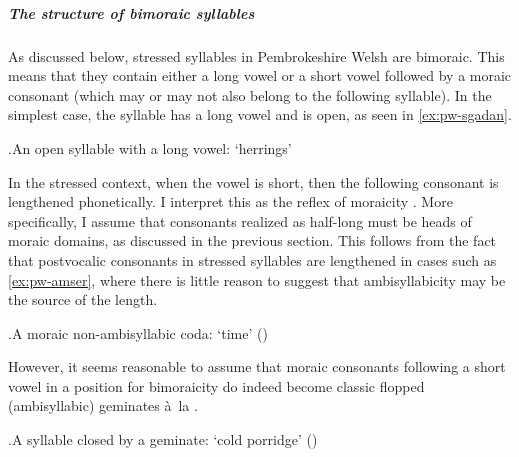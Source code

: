 \subparagraph{The structure of bimoraic syllables}
\label{sec:struct-bimor-syll}

As discussed below, stressed syllables in Pembrokeshire Welsh are bimoraic. This means that they contain either a long vowel or a short vowel followed by a moraic consonant (which may or may not also belong to the following syllable). In the simplest case, the syllable has a long vowel and is open, as seen in \ref{ex:pw-sgadan}.

\ex.\label{ex:pw-sgadan}An open syllable with a long vowel: \ipa{[ˈskaːdan]} `herrings'\\

In the stressed context, when the vowel is short, then the following consonant is lengthened phonetically. I interpret this as the reflex of moraicity \citep[\cfm][]{broselow97:_syllab}. More specifically, I assume that consonants realized as half\hyp long must be heads of moraic domains, as discussed in the previous section. This follows from the fact that postvocalic consonants in stressed syllables are lengthened in cases such as \cref{ex:pw-amser}, where there is little reason to suggest that ambisyllabicity may be the source of the length.

\ex.\label{ex:pw-amser}A moraic non-ambisyllabic coda: \ipa{[ˈamser]} `time' ()\\


However, it seems reasonable to assume that moraic consonants following a short vowel in a position for bimoraicity do indeed become classic flopped (ambisyllabic) geminates à~la \citet{hyman85}.

\ex.\label{ex:pw-sopas}A syllable closed by a geminate: \ipa{[ˈsopas]} `cold porridge' ()\\

